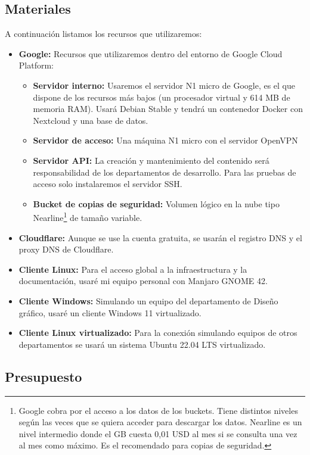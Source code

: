 \subsection{Materiales}
A continuación listamos los recursos que utilizaremos:
\begin{itemize}
    \item \textbf{Google:} Recursos que utilizaremos dentro del entorno de Google Cloud Platform:
    \begin{itemize}
        \item \textbf{Servidor interno:} Usaremos el servidor N1 micro de Google, es el que dispone de los recursos más bajos (un procesador virtual y 614 MB de memoria RAM). Usará Debian Stable y tendrá un contenedor Docker con Nextcloud y una base de datos.
        \item \textbf{Servidor de acceso:} Una máquina N1 micro con el servidor OpenVPN
        \item \textbf{Servidor API:} La creación y mantenimiento del contenido será responsabilidad de los departamentos de desarrollo. Para las pruebas de acceso solo instalaremos el servidor SSH.
        \item \textbf{Bucket de copias de seguridad:} Volumen lógico en la nube tipo Nearline\footnote{Google cobra por el acceso a los datos de los buckets. Tiene distintos niveles según las veces que se quiera acceder para descargar los datos. Nearline es un nivel intermedio donde el GB cuesta 0,01 USD al mes si se consulta una vez al mes como máximo. Es el recomendado para copias de seguridad.} de tamaño variable.
    \end{itemize}
    \item \textbf{Cloudflare:} Aunque se use la cuenta gratuita, se usarán el registro DNS y el proxy DNS de Cloudflare.
    \item \textbf{Cliente Linux:} Para el acceso global a la infraestructura y la documentación, usaré mi equipo personal con Manjaro GNOME 42.
    \item \textbf{Cliente Windows:} Simulando un equipo del departamento de Diseño gráfico, usaré un cliente Windows 11 virtualizado.
    \item \textbf{Cliente Linux virtualizado:} Para la conexión simulando equipos de otros departamentos se usará un sistema Ubuntu 22.04 LTS virtualizado.
\end{itemize}
\subsection{Presupuesto}

